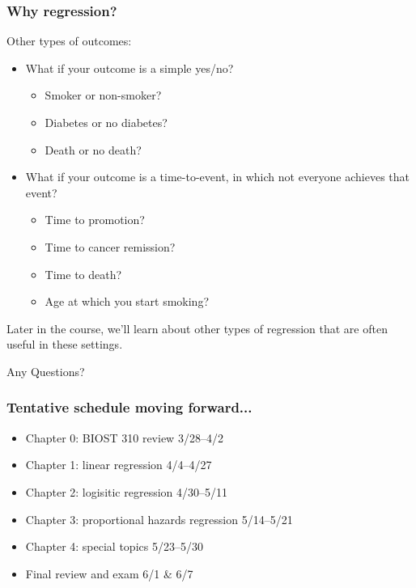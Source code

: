 \documentclass[12pt, 
hyperref={colorlinks=true, linkcolor=blue, urlcolor=cyan}]{beamer}
\begin{document}
\begin{frame}
\frametitle{Why regression?}
Other types of outcomes:
\begin{itemize}
\item What if your outcome is a simple yes/no?
	\begin{itemize}
	\item Smoker or non-smoker?
	\item Diabetes or no diabetes?
	\item Death or no death?
	\end{itemize}
\item What if your outcome is a time-to-event, in which not everyone achieves that event?
	\begin{itemize}
	\item Time to promotion?
	\item Time to cancer remission?
	\item Time to death?
	\item Age at which you start smoking? %
	\end{itemize}
\end{itemize}

Later in the course, we'll learn about other types of regression that are often useful in these settings.
\end{frame}

\begin{frame}
\center \Large Any Questions?
\end{frame}

\begin{frame}
\frametitle{Tentative schedule moving forward...}
\begin{itemize}
\item Chapter 0: BIOST 310 review \hfill 3/28--4/2
\item Chapter 1: linear regression \hfill 4/4--4/27
\item Chapter 2: logisitic regression \hfill 4/30--5/11
\item Chapter 3: proportional hazards regression \hfill 5/14--5/21
\item Chapter 4: special topics \hfill 5/23--5/30
\item Final review and exam \hfill 6/1 \& 6/7
\end{itemize}
\end{frame}


\end{document}
